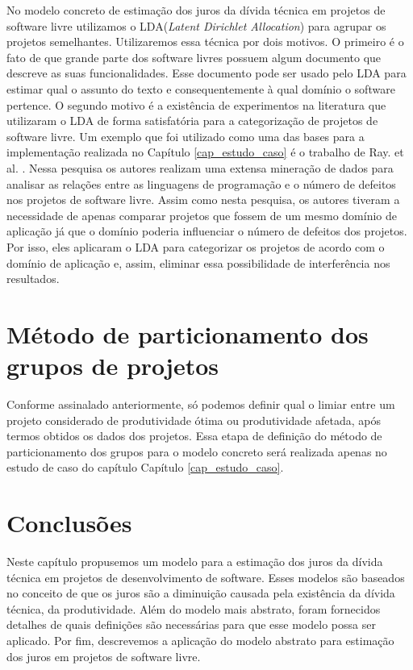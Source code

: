 No modelo concreto de estimação dos juros da dívida técnica em projetos de software livre utilizamos o LDA(\textit{Latent Dirichlet Allocation}) para agrupar os projetos semelhantes. Utilizaremos essa técnica por dois motivos. O primeiro é o fato de que grande parte dos software livres possuem algum documento que descreve as suas funcionalidades. Esse documento pode ser usado pelo LDA para estimar qual o assunto do texto e consequentemente à qual domínio o software pertence. O segundo motivo é a existência de experimentos na literatura que utilizaram o LDA de forma satisfatória para a categorização de projetos de software livre. Um exemplo que foi utilizado como uma das bases para a implementação realizada no Capítulo \ref{cap_estudo_caso}  é o trabalho de Ray. et al. \cite{ray2014large}. Nessa pesquisa os autores realizam uma extensa mineração de dados para analisar as relações entre as linguagens de programação e o número de defeitos nos projetos de software livre. Assim como nesta pesquisa, os autores tiveram a necessidade de apenas comparar projetos que fossem de um mesmo domínio de aplicação já que o domínio poderia influenciar o número de defeitos dos projetos. Por isso, eles aplicaram o LDA para categorizar os projetos de acordo com o domínio de aplicação e, assim, eliminar essa possibilidade de interferência nos resultados.

\section{Método de particionamento dos grupos de projetos}

Conforme assinalado anteriormente, só podemos definir qual o limiar entre um projeto considerado de produtividade ótima ou produtividade afetada, após termos obtidos os dados dos projetos.  Essa etapa de definição do método de particionamento dos grupos para o modelo concreto será realizada apenas no estudo de caso do capítulo  Capítulo \ref{cap_estudo_caso}.


\section{Conclusões}
Neste capítulo propusemos um modelo para a estimação dos juros da dívida técnica em projetos de desenvolvimento de software. Esses modelos são baseados no conceito de que os juros são a diminuição causada pela existência da dívida técnica, da produtividade. Além do modelo mais abstrato, foram fornecidos detalhes de quais definições são necessárias para que esse modelo possa ser aplicado. Por fim, descrevemos a aplicação do modelo abstrato para estimação dos juros em projetos de software livre.





 
 
 